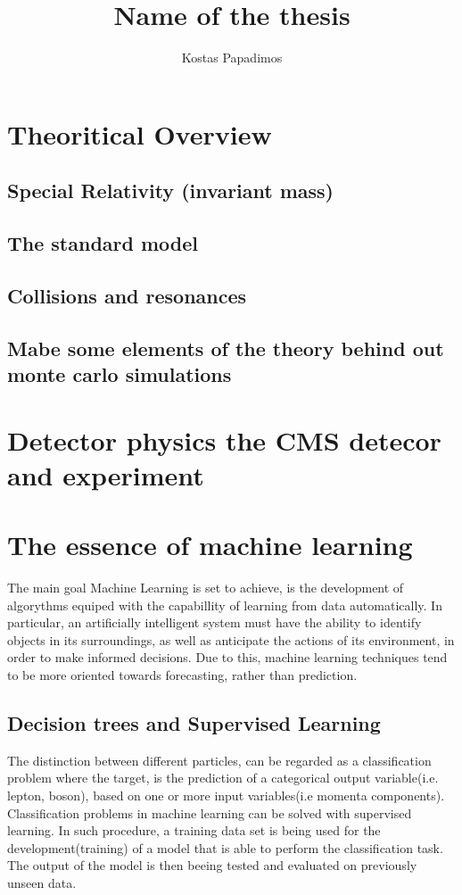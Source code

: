 \documentclass[11pt,a4paper]{article}
\author{Kostas Papadimos}
\date{}
\title{Name of the thesis}
\begin{document}
\maketitle
\tableofcontents


\section{Theoritical Overview}
\label{sec:org1cde7ce}
\subsection{Special Relativity (invariant mass)}
\label{sec:org611a320}
\subsection{The standard model}
\label{sec:org8437e2e}
\subsection{Collisions and resonances}
\label{sec:org2fda354}
\subsection{Mabe some elements of the theory behind out monte carlo simulations}
\label{sec:org85c3cc6}
\section{Detector physics the CMS detecor and experiment}
\label{sec:orgc3c8d3d}
\section{The essence of machine learning}
\label{sec:orge7a4da2}
The main goal Machine Learning is set to achieve, is the development of algorythms equiped with the capabillity of learning from data automatically. In particular, an artificially intelligent system must have the ability to identify objects in its surroundings, as well as anticipate the actions of its environment, in order to make informed decisions. Due to this, machine learning techniques tend to be more oriented towards forecasting, rather than prediction.
\subsection{Decision trees and Supervised Learning}
\label{sec:org744230c}
The distinction between different particles, can be regarded as a classification problem where the target, is the prediction of a categorical output variable(i.e. lepton, boson), based on one or more input variables(i.e momenta components). Classification problems in  machine learning can be solved with supervised learning. In such procedure, a training data set is being used for the development(training) of a model that is able to perform the classification task. The output of the model is then beeing tested and evaluated on previously unseen data.
\end{document}
